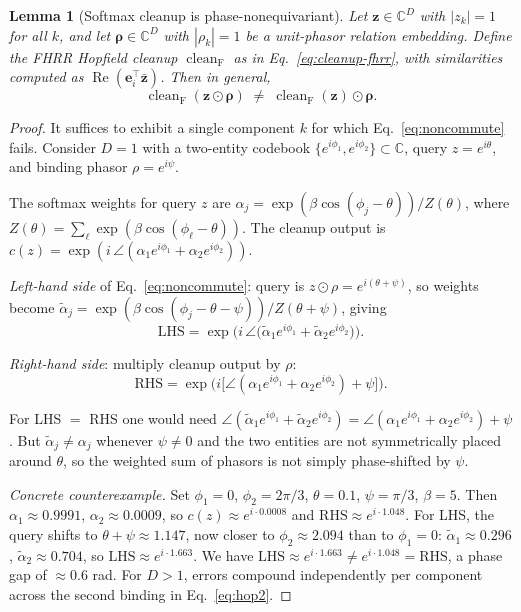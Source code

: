 \documentclass[11pt]{article}
\newtheorem{lemma}[theorem]{Lemma}
\theoremstyle{definition}
\newcommand{\Cb}{\mathbb{C}}
\newcommand{\ev}[1]{\mathbf{e}_{#1}}
\DeclareMathOperator{\cleanupop}{clean}
\DeclareMathOperator{\Real}{Re}
\begin{document}
\begin{lemma}[Softmax cleanup is phase-nonequivariant]
\label{lem:softmax-noncommute}
Let $\mathbf{z} \in \Cb^D$ with $|z_k|=1$ for all $k$, and let
$\boldsymbol{\rho} \in \Cb^D$ with $|\rho_k|=1$ be a unit-phasor relation
embedding. Define the FHRR Hopfield cleanup $\cleanupop_{\mathrm{F}}$ as in
Eq.~\eqref{eq:cleanup-fhrr}, with similarities computed as
$\Real(\ev{i}^\top \bar{\mathbf{z}})$. Then in general,
\begin{equation}
  \cleanupop_{\mathrm{F}}(\mathbf{z} \odot \boldsymbol{\rho})
  \;\neq\;
  \cleanupop_{\mathrm{F}}(\mathbf{z}) \odot \boldsymbol{\rho}.
  \label{eq:noncommute}
\end{equation}
\end{lemma}

\begin{proof}
It suffices to exhibit a single component $k$ for which
Eq.~\eqref{eq:noncommute} fails. Consider $D=1$ with a two-entity
codebook $\{e^{i\phi_1}, e^{i\phi_2}\} \subset \Cb$, query $z = e^{i\theta}$,
and binding phasor $\rho = e^{i\psi}$.

The softmax weights for query $z$ are
$\alpha_j = \exp(\beta\cos(\phi_j - \theta)) / Z(\theta)$,
where $Z(\theta) = \sum_\ell \exp(\beta\cos(\phi_\ell - \theta))$.
The cleanup output is $c(z) = \exp(i\,\angle(\alpha_1 e^{i\phi_1} + \alpha_2 e^{i\phi_2}))$.

\textit{Left-hand side} of Eq.~\eqref{eq:noncommute}: query is 
$z \odot \rho = e^{i(\theta+\psi)}$, so weights become
$\tilde\alpha_j = \exp(\beta\cos(\phi_j - \theta - \psi)) / Z(\theta+\psi)$,
giving
\[
  \mathrm{LHS} = \exp\!\bigl(i\,\angle\bigl(\tilde\alpha_1 e^{i\phi_1} + \tilde\alpha_2 e^{i\phi_2}\bigr)\bigr).
\]

\textit{Right-hand side}: multiply cleanup output by $\rho$:
\[
  \mathrm{RHS} = \exp\!\bigl(i\bigl[\angle(\alpha_1 e^{i\phi_1} + \alpha_2 e^{i\phi_2}) + \psi\bigr]\bigr).
\]

For LHS $=$ RHS one would need
$\angle(\tilde\alpha_1 e^{i\phi_1} + \tilde\alpha_2 e^{i\phi_2})
= \angle(\alpha_1 e^{i\phi_1} + \alpha_2 e^{i\phi_2}) + \psi$.
But $\tilde\alpha_j \neq \alpha_j$ whenever $\psi \neq 0$ and the two entities
are not symmetrically placed around $\theta$, so the weighted sum of phasors
is not simply phase-shifted by $\psi$.

\textit{Concrete counterexample.}
Set $\phi_1 = 0$, $\phi_2 = 2\pi/3$, $\theta = 0.1$, $\psi = \pi/3$,
$\beta = 5$.
Then $\alpha_1 \approx 0.9991$, $\alpha_2 \approx 0.0009$,
so $c(z) \approx e^{i \cdot 0.0008}$ and
$\mathrm{RHS} \approx e^{i \cdot 1.048}$.
For LHS, the query shifts to $\theta + \psi \approx 1.147$, now closer to
$\phi_2 \approx 2.094$ than to $\phi_1 = 0$:
$\tilde\alpha_1 \approx 0.296$, $\tilde\alpha_2 \approx 0.704$,
so $\mathrm{LHS} \approx e^{i \cdot 1.663}$.
We have $\mathrm{LHS} \approx e^{i \cdot 1.663} \neq e^{i \cdot 1.048} = \mathrm{RHS}$,
a phase gap of $\approx 0.6$ rad. For $D > 1$, errors compound
independently per component across the second binding in Eq.~\eqref{eq:hop2}.
\end{proof}
\end{document}
